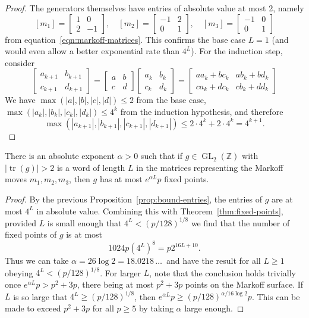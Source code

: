 \documentclass[10pt]{amsart}
\theoremstyle{definition}\newtheorem{defi}[theo]{Definition}\newtheorem{rema}[theo]{Remark}\newtheorem{exam}[theo]{Example}\newtheorem{exem}[theo]{Example}\newtheorem{nota}[theo]{Notation}
\newcommand{\Z}{\mathbb{Z}}
\DeclareMathOperator{\tr}{tr}
\DeclareMathOperator{\GL}{GL}
\begin{document}
\begin{proof}
The generators themselves have entries of absolute value at most 2, namely
\[
[m_1] =
\begin{bmatrix}
1 & 0 \\
2 & -1
\end{bmatrix},\quad [m_2] =
\begin{bmatrix}
-1 & 2 \\
0 & 1
\end{bmatrix},\quad [m_3] =
\begin{bmatrix}
-1 & 0 \\
0 & 1
\end{bmatrix}
\]
from equation~\eqref{eqn:markoff-matrices}. This confirms the base case $L=1$ (and would even allow a better exponential rate than $4^L$). For the induction step, consider
\[
\begin{bmatrix} a_{k+1} & b_{k+1} \\ c_{k+1} & d_{k+1}
\end{bmatrix}
=
\begin{bmatrix} a & b \\ c & d
\end{bmatrix}
\begin{bmatrix} a_k & b_k\\ c_k & d_k
\end{bmatrix}
=
\begin{bmatrix}
aa_k + bc_k & ab_k+bd_k \\ ca_k + dc_k & cb_k + dd_k
\end{bmatrix}
\]
We have $\max(|a|,|b|,|c|,|d|) \leq 2$ from the base case, $\max(|a_{k}|,|b_{k}|,|c_{k}|,|d_{k}|) \leq 4^k$ from the induction hypothesis, and therefore
\[
\max(|a_{k+1}|,|b_{k+1}|,|c_{k+1}|,|d_{k+1}|) \leq 2 \cdot 4^k + 2 \cdot 4^k = 4^{k+1}.
\]
\end{proof}

\begin{coro}
There is an absolute exponent $\alpha > 0$ such that if $g \in \GL_2(\Z)$ with $|\tr(g)|>2$ is a word of length $L$ in the matrices representing the Markoff moves $m_1,m_2,m_3$, then $g$ has at most $e^{\alpha L}p$ fixed points.
\end{coro}
\begin{proof}
By the previous Proposition~\ref{prop:bound-entries}, the entries of $g$ are at most $4^L$ in absolute value. Combining this with Theorem~\ref{thm:fixed-points}, provided $L$ is small enough that $4^L < (p/128)^{1/8}$ we find that the number of fixed points of $g$ is at most
\[
1024 p \left(4^L\right)^8 = p 2^{16L+10}.
\]
Thus we can take $\alpha = 26\log{2} = 18.0218\,\ldots\,$ and have the result for all $L \geq 1$ obeying $4^L < (p/128)^{1/8}$. For larger $L$, note that the conclusion holds trivially once $e^{\alpha L}p > p^2+3p$, there being at most $p^2+3p$ points on the Markoff surface. If $L$ is so large that $4^L \geq (p/128)^{1/8}$, then $e^{\alpha L}p \geq (p/128)^{\alpha/16\log{2}} p$. This can be made to exceed $p^2+3p$ for all $p \geq 5$ by taking $\alpha$ large enough.
\end{proof}
\end{document}

